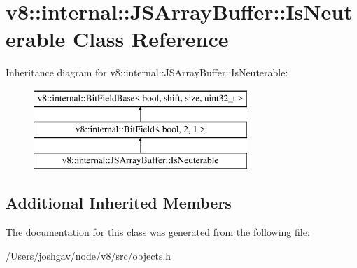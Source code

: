 \hypertarget{classv8_1_1internal_1_1_j_s_array_buffer_1_1_is_neuterable}{}\section{v8\+:\+:internal\+:\+:J\+S\+Array\+Buffer\+:\+:Is\+Neuterable Class Reference}
\label{classv8_1_1internal_1_1_j_s_array_buffer_1_1_is_neuterable}
Inheritance diagram for v8\+:\+:internal\+:\+:J\+S\+Array\+Buffer\+:\+:Is\+Neuterable\+:\begin{figure}[H]
\begin{center}
\leavevmode
\includegraphics[height=3.000000cm]{classv8_1_1internal_1_1_j_s_array_buffer_1_1_is_neuterable}
\end{center}
\end{figure}
\subsection*{Additional Inherited Members}


The documentation for this class was generated from the following file\+:\begin{DoxyCompactItemize}
\item 
/\+Users/joshgav/node/v8/src/objects.\+h\end{DoxyCompactItemize}
